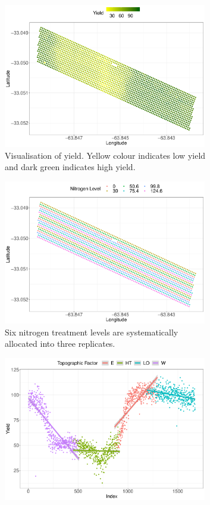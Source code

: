 \documentclass[a4paper]{article}   	%
\begin{document}
	
	\begin{figure}[!htp]
		\centering	
		\begin{subfigure}[t]{0.45\textwidth}
			\centering
			\includegraphics[height=6.3cm,width=\linewidth]{Images/lasrossa_view01}
			\caption{Visualisation of yield. Yellow colour indicates low yield and dark green indicates high yield.}\label{fig:lasrossayield}
		\end{subfigure}
		\space
		\begin{subfigure}[t]{0.45\textwidth}
			\centering
			\includegraphics[height=6.3cm,width=\linewidth]{Images/lasrossa_view06}
			\caption{Six nitrogen treatment levels are systematically allocated into three replicates.}\label{fig:lasrossatopo}
		\end{subfigure}
		\begin{subfigure}[t]{0.45\textwidth}
			\centering
			\includegraphics[height=6.3cm,width=\linewidth]{Images/lasrossa_view05}

\end{subfigure}
\end{figure}
\end{document}
